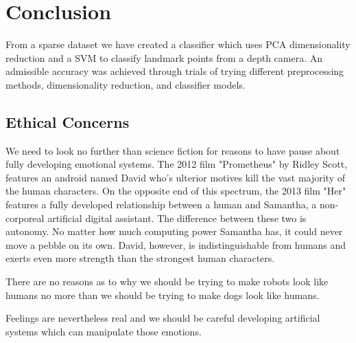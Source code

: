 \section{Conclusion}

From a sparse dataset we have created a classifier which uses PCA dimensionality reduction and a SVM to classify landmark points from a depth camera. An admissible accuracy was achieved through trials of trying different preprocessing methods, dimensionality reduction, and classifier models.

\subsection{Ethical Concerns}
We need to look no further than science fiction for reasons to have pause about fully developing emotional systems. The 2012 film "Prometheus" by Ridley Scott, features an android named David who's ulterior motives kill the vast majority of the human characters. On the opposite end of this spectrum, the 2013 film "Her" features a fully developed relationship between a human and Samantha, a non-corporeal artificial digital assistant. The difference between these two is autonomy. No matter how much computing power Samantha has, it could never move a pebble on its own. David, however, is indistinguishable from humans and exerts even more strength than the strongest human characters.

There are no reasons as to why we should be trying to make robots look like humans no more than we should be trying to make dogs look like humans.

Feelings are nevertheless real and we should be careful developing artificial systems which can manipulate those emotions.
